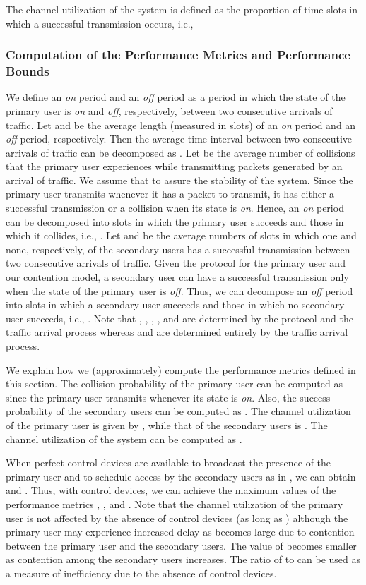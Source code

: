 \documentclass[12pt,draftclsnofoot,onecolumn]{IEEEtran}
\begin{document}
The channel utilization of the system is defined as the proportion of
time slots in which a successful transmission occurs, i.e.,


\subsubsection{Computation of the Performance Metrics and Performance Bounds}

We define an \emph{on} period and an \emph{off} period as a period
in which the state of the primary user is \emph{on} and \emph{off}, respectively,
between two consecutive arrivals of traffic.
Let  and  be the average length
(measured in slots) of an \emph{on} period and an \emph{off} period, respectively.
Then the average time interval between two consecutive arrivals of traffic can be decomposed as
.
Let  be the average number of collisions that the primary user experiences
while transmitting packets generated by an arrival of traffic.
We assume that  to assure the stability of the system.
Since the primary user transmits whenever it has a packet to transmit, it has either
a successful transmission or a collision when its state is \emph{on}.
Hence, an \emph{on} period can be decomposed into slots in which the primary user succeeds
and those in which it collides, i.e., .
Let  and  be the average numbers of slots
in which one and none, respectively, of the
secondary users has a successful transmission between two consecutive arrivals of traffic.
Given the protocol for the primary user and our contention model,
a secondary user can have a successful transmission only when the state of the
primary user is \emph{off}. Thus, we can decompose an \emph{off} period into slots in which
a secondary user succeeds and those in which no secondary user succeeds, i.e.,
.
Note that , , , , and  are determined by the protocol
and the traffic arrival process whereas
 and  are determined entirely by the traffic arrival process.

We explain how we (approximately) compute the performance metrics defined in this section.
The collision probability of the primary user can be computed as
 since the primary user transmits
whenever its state is \emph{on}. Also, the success
probability of the secondary users can be computed as .
The channel utilization of the primary user is given by ,
while that of the secondary users is .
The channel utilization of the system can be computed as .

When perfect control devices are available to broadcast the presence
of the primary user and to schedule access by the secondary users as in
\cite{chou}, we can obtain  and . Thus,
with control devices, we can achieve the maximum values of the performance
metrics , ,
and .
Note that the channel utilization of the primary user is not affected by the absence of
control devices (as long as ) although the primary user may experience increased delay
as  becomes large due to contention between the primary user and the secondary users.
The value of  becomes smaller as contention among the secondary users increases.
The ratio of  to  can be used as a measure of inefficiency
due to the absence of control devices.
\end{document}
